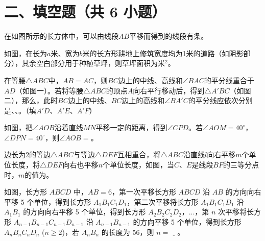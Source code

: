\section*{二、填空题（共 6 小题）}

\blanklist[9]

\item 在如图所示的长方体中，可以由线段$AB$平移而得到的线段有\underline{\hspace{3cm}}条。


\item 如图，在长为$a$米、宽为$b$米的长方形耕地上修筑宽度均为1米的道路（如阴影部分），其余空白部分用于种植草坪，则草坪面积为\underline{\hspace{4cm}}米$^2$。


\item 在等腰$\triangle ABC$中，$AB=AC$，则$BC$边上的中线、高线和$\angle BAC$的平分线重合于$AD$（如图一）。若将等腰$\triangle ABC$的顶点$A$向右平行移动后，得到$\triangle A'BC$（如图二），那么，此时$BC$边上的中线、$BC$边上的高线和$\angle BA'C$的平分线应依次分别是\underline{\hspace{1.4cm}}、\underline{\hspace{1.4cm}}、\underline{\hspace{1.4cm}}。（填$A'D$、$A'E$、$A'F$）


\item 如图，把$\angle AOB$沿着直线$MN$平移一定的距离，得到$\angle CPD$。若$\angle AOM=40^\circ$，$\angle DPN=40^\circ$，则$\angle AOB=$\underline{\hspace{2cm}}。


\item 边长为2的等边$\triangle ABC$与等边$\triangle DEF$互相重合，将$\triangle ABC$沿直线$l$向右平移$m$个单位长度，将$\triangle DEF$向右也平移$n$个单位长度，如图，当$C$、$E$是线段$BF$的三等分点时，$m$的值为\underline{\hspace{2cm}}。



\item 如图，长方形 $ABCD$ 中，$AB=6$，第一次平移长方形 $ABCD$ 沿 $AB$ 的方向向右平移 5 个单位，得到长方形 $A_1B_1C_1D_1$，第二次平移将长方形 $A_1B_1C_1D_1$ 沿 $A_1B_1$ 的方向向右平移 5 个单位，得到长方形 $A_2B_2C_2D_2$，...，第 $n$ 次平移将长方形 $A_{n-1}B_{n-1}C_{n-1}D_{n-1}$ 沿 $A_{n-1}B_{n-1}$ 的方向平移 5 个单位，得到长方形 $A_nB_nC_nD_n$ ($n \geq 2$)，若 $A_nB_n$ 的长度为 56，则 $n=\underline{\quad }$。

